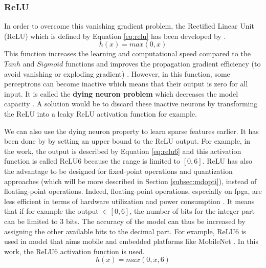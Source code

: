 \subsubsection{ReLU}
In order to overcome this vanishing gradient problem, the Rectified Linear Unit (ReLU) which is defined by Equation \eqref{eq:relu} has been developed by \textcite{krizhevsky_imagenet_2012}.
%
\begin{equation}
    h(x) = max(0, x)
    \label{eq:relu}
\end{equation}
%
This function increases the learning and computational speed compared to the $Tanh$ and $Sigmoid$ functions and improves the propagation gradient efficiency (to avoid vanishing or exploding gradient) \cite{maas_rectier_2013, abdelouahab_accelerating_2018}. However, in this function, some perceptrons can become inactive which means that their output is zero for all input. It is called the \textbf{dying neuron problem} which decreases the model capacity \cite{matteucci_artificial_2019}. A solution would be to discard these inactive neurons by transforming the ReLU into a leaky ReLU \cite{maas_rectier_2013} activation function for example.

We can also use the dying neuron property to learn sparse features earlier. It has been done by \textcite{krizhevsky_convolutional_2010} by setting an upper bound to the ReLU output. For example, in the work, the output is described by Equation \eqref{eq:relu6} and this activation function is called ReLU6 because the range is limited to $[0, 6]$. ReLU has also the advantage to be designed for fixed-point operations and quantization approaches (which will be more described in Section \ref{subsec:mdopti}), instead of floating-point operations. Indeed, floating-point operations, especially on \acrshort{fpga}, are less efficient in terms of hardware utilization and power consumption \cite{david_hardware_2007}. It means that if for example the output $ \in [0, 6]$, the number of bits for the integer part can be limited to 3 bits. The accuracy of the model can thus be increased by assigning the other available bits to the decimal part. For example, ReLU6 is used in model that aims mobile and embedded platforms like MobileNet \cite{howard_mobilenets_2017}. In this work, the ReLU6 activation function is used.
%
\begin{equation}
    h(x) = max(0, x, 6)
    \label{eq:relu6}
\end{equation}
